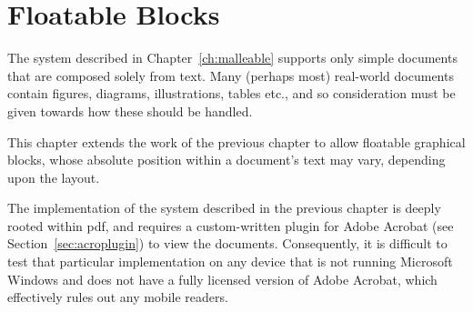 \cleardoublepage
\chapter{Floatable Blocks}\label{ch:floats}


% 

The system described in Chapter~\ref{ch:malleable} supports only simple documents that are composed solely from text. Many (perhaps most) real-world documents contain figures, diagrams, illustrations, tables etc., and so consideration must be given towards how these should be handled.

This chapter extends the work of the previous chapter to allow floatable graphical blocks, whose absolute position within a document's text may vary, depending upon the layout.


The implementation of the system described in the previous chapter is deeply rooted within \gls{pdf}, and requires a custom-written plugin for Adobe Acrobat (see Section~\ref{sec:acroplugin}) to view the documents. Consequently, it is difficult to test that particular implementation on any device that is not running Microsoft Windows and does not have a fully licensed version of Adobe Acrobat, which effectively rules out any mobile \ebook{} readers.

